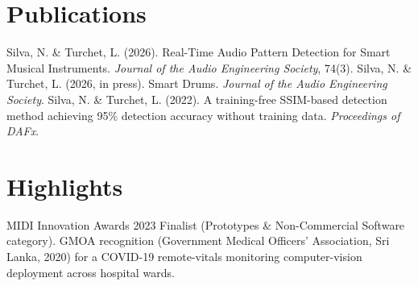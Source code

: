 \documentclass[11pt]{article}
\begin{document}
\section*{Publications}
Silva, N. \& Turchet, L. (2026). Real-Time Audio Pattern Detection for Smart Musical Instruments. \textit{Journal of the Audio Engineering Society}, 74(3). Silva, N. \& Turchet, L. (2026, in press). Smart Drums. \textit{Journal of the Audio Engineering Society}. Silva, N. \& Turchet, L. (2022). A training-free SSIM-based detection method achieving 95\% detection accuracy without training data. \textit{Proceedings of DAFx}.

\section*{Highlights}
MIDI Innovation Awards 2023 Finalist (Prototypes \& Non-Commercial Software category). GMOA recognition (Government Medical Officers' Association, Sri Lanka, 2020) for a COVID-19 remote-vitals monitoring computer-vision deployment across hospital wards.
\end{document}
